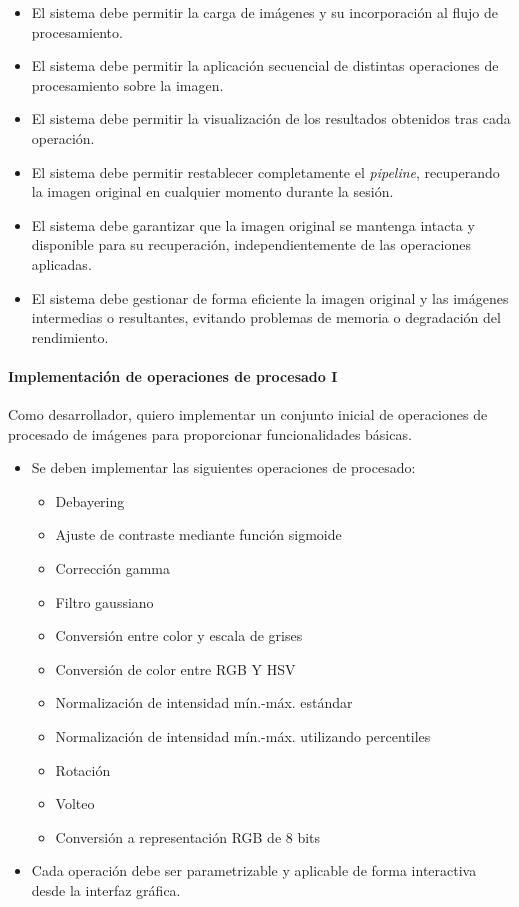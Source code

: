 \begin{itemize}[noitemsep]
	\item El sistema debe permitir la carga de imágenes y su incorporación al flujo de procesamiento.
	\item El sistema debe permitir la aplicación secuencial de distintas operaciones de procesamiento sobre la imagen.
	\item El sistema debe permitir la visualización de los resultados obtenidos tras cada operación.
	\item El sistema debe permitir restablecer completamente el \textit{pipeline}, recuperando la imagen original en cualquier momento durante la sesión.
	\item El sistema debe garantizar que la imagen original se mantenga intacta y disponible para su recuperación, independientemente de las operaciones aplicadas.
	\item El sistema debe gestionar de forma eficiente la imagen original y las imágenes intermedias o resultantes, evitando problemas de memoria o degradación del rendimiento.
\end{itemize}

\paragraph{Implementación de operaciones de procesado I} \label{hist:implementacion_operaciones_procesado_i}
Como desarrollador, quiero implementar un conjunto inicial de operaciones de procesado de imágenes para proporcionar funcionalidades
básicas.

\begin{itemize}[noitemsep]
	\item Se deben implementar las siguientes operaciones de procesado: 
	\begin{itemize}[noitemsep]
		\item Debayering
		\item Ajuste de contraste mediante función sigmoide
		\item Corrección gamma
		\item Filtro gaussiano
		\item Conversión entre color y escala de grises
		\item Conversión de color entre RGB Y HSV
		\item Normalización de intensidad mín.-máx. estándar
		\item Normalización de intensidad mín.-máx. utilizando percentiles
		\item Rotación
		\item Volteo
		\item Conversión a representación RGB de 8 bits
	\end{itemize}
	\item Cada operación debe ser parametrizable y aplicable de forma interactiva desde la interfaz gráfica.
\end{itemize}

